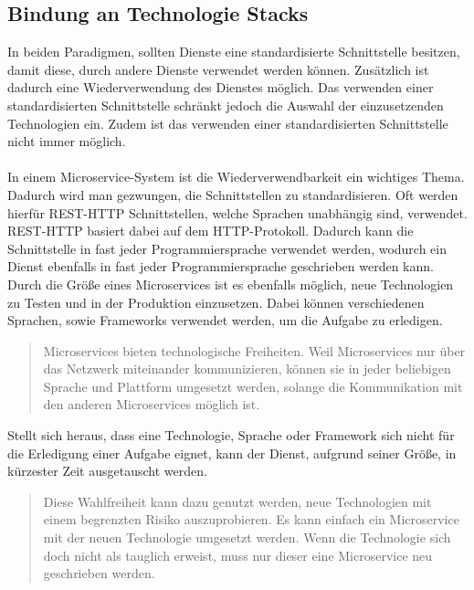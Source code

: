 \subsection{Bindung an Technologie Stacks}
\label{subsec:BindungAnTechnologiestacks}
In beiden Paradigmen, sollten Dienste eine standardisierte Schnittstelle besitzen, damit diese, durch andere Dienste verwendet werden können. Zusätzlich ist dadurch eine Wiederverwendung des Dienstes möglich. Das verwenden einer standardisierten Schnittstelle schränkt jedoch die Auswahl der einzusetzenden Technologien ein. Zudem ist das verwenden einer standardisierten Schnittstelle nicht immer möglich.
\\\\
In einem Microservice-System ist die Wiederverwendbarkeit ein wichtiges Thema. Dadurch wird man gezwungen, die Schnittstellen zu standardisieren. Oft werden hierfür REST-HTTP Schnittstellen, welche Sprachen unabhängig sind, verwendet. REST-HTTP basiert dabei auf dem HTTP-Protokoll. Dadurch kann die Schnittstelle in fast jeder Programmiersprache verwendet werden, wodurch ein Dienst ebenfalls in fast jeder Programmiersprache geschrieben werden kann. Durch die Größe eines Microservices ist es ebenfalls möglich, neue Technologien zu Testen und in der Produktion einzusetzen. Dabei können verschiedenen Sprachen, sowie Frameworks verwendet werden, um die Aufgabe zu erledigen. 

\begin{quotation}
	\frqq Microservices bieten technologische Freiheiten. Weil Microservices nur über das Netzwerk miteinander kommunizieren, können sie in jeder beliebigen Sprache und Plattform umgesetzt werden, solange die Kommunikation mit den anderen Microservices möglich ist.\flqq\ \cite[S. 66]{EWolff2016:Microservices}
\end{quotation}

Stellt sich heraus, dass eine Technologie, Sprache oder Framework sich nicht für die Erledigung einer Aufgabe eignet, kann der Dienst, aufgrund seiner Größe, in kürzester Zeit ausgetauscht werden.

\begin{quotation}
	\frqq Diese Wahlfreiheit kann dazu genutzt werden, neue Technologien mit einem begrenzten Risiko auszuprobieren. Es kann einfach ein Microservice mit der neuen Technologie umgesetzt werden. Wenn die Technologie sich doch nicht als tauglich erweist, muss nur dieser eine Microservice neu geschrieben werden.\flqq\ \cite[S. 66]{EWolff2016:Microservices}
\end{quotation}


